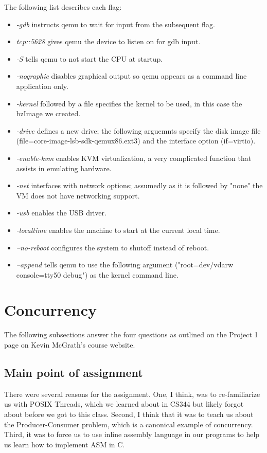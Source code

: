 \documentclass[letterpaper,10pt,titlepage]{article}
\begin{document}
The following list describes each flag:
\begin{itemize}
\item \emph{-gdb} instructs qemu to wait for input from the subsequent flag.
\item \emph{tcp::5628} gives qemu the device to listen on for gdb input.
\item \emph{-S} tells qemu to not start the CPU at startup.
\item \emph{-nographic} disables graphical output so qemu appears as a command line application only.
\item \emph{-kernel} followed by a file specifies the kernel to be used, in this case the bzImage we created.
\item \emph{-drive} defines a new drive; the following arguemnts specify the disk image file (file=core-image-lsb-sdk-qemux86.ext3) and the interface option (if=virtio).
\item \emph{-enable-kvm} enables KVM virtualization, a very complicated function that assists in emulating hardware.
\item \emph{-net} interfaces with network options; assumedly as it is followed by "none" the VM does not have networking support. 
\item \emph{-usb} enables the USB driver.
\item \emph{-localtime} enables the machine to start at the current local time.
\item \emph{--no-reboot} configures the system to shutoff instead of reboot.
\item \emph{--append} tells qemu to use the following argument ("root=dev/vdarw console=tty50 debug") as the kernel command line.
\end{itemize}

\section{Concurrency}
The following subsections answer the four questions as outlined on the Project 1 page on Kevin McGrath's course website.
\subsection{Main point of assignment}
There were several reasons for the assignment. One, I think, was to re-familiarize us with POSIX Threads, which we learned about in CS344 but likely forgot about before we got to this class. Second, I think that it was to teach us about the Producer-Consumer problem, which is a canonical example of concurrency. Third, it was to force us to use inline assembly language in our programs to help us learn how to implement ASM in C.
\end{document}
